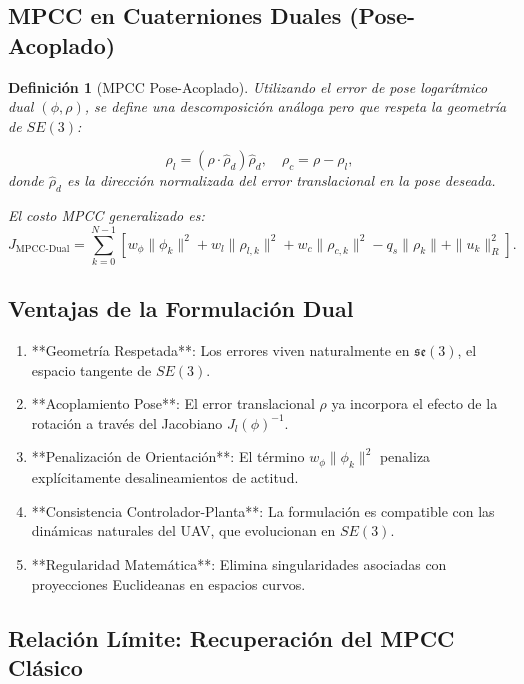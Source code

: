 \documentclass[11pt,a4paper]{article}
\newtheorem{definition}[theorem]{Definición}
\begin{document}
\subsection{MPCC en Cuaterniones Duales (Pose-Acoplado)}

\begin{definition}[MPCC Pose-Acoplado]
Utilizando el error de pose logarítmico dual $(\phi, \rho)$, se define una descomposición análoga pero que respeta la geometría de $SE(3)$:

\begin{equation}
    \rho_l = (\rho \cdot \hat{\rho}_d) \hat{\rho}_d, \quad \rho_c = \rho - \rho_l,
\end{equation}
donde $\hat{\rho}_d$ es la dirección normalizada del error translacional en la pose deseada.

El costo MPCC generalizado es:
\begin{equation}
    J_{\text{MPCC-Dual}} = \sum_{k=0}^{N-1} \left[ 
        w_\phi \|\phi_k\|^2 + w_l \|\rho_{l,k}\|^2 + w_c \|\rho_{c,k}\|^2 - q_s \|\rho_k\| + \|u_k\|_R^2 
    \right].
    \label{eq:mpcc_dual_cost}
\end{equation}
\end{definition}

\subsection{Ventajas de la Formulación Dual}

\begin{enumerate}
    \item **Geometría Respetada**: Los errores viven naturalmente en $\mathfrak{se}(3)$, el espacio tangente de $SE(3)$.
    \item **Acoplamiento Pose**: El error translacional $\rho$ ya incorpora el efecto de la rotación a través del Jacobiano $J_l(\phi)^{-1}$.
    \item **Penalización de Orientación**: El término $w_\phi \|\phi_k\|^2$ penaliza explícitamente desalineamientos de actitud.
    \item **Consistencia Controlador-Planta**: La formulación es compatible con las dinámicas naturales del UAV, que evolucionan en $SE(3)$.
    \item **Regularidad Matemática**: Elimina singularidades asociadas con proyecciones Euclideanas en espacios curvos.
\end{enumerate}

\subsection{Relación Límite: Recuperación del MPCC Clásico}
\end{document}
